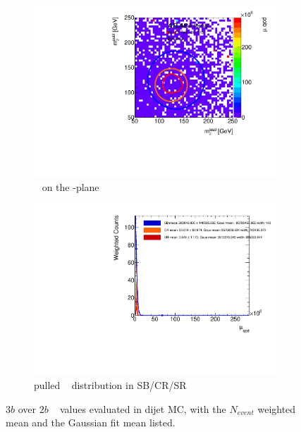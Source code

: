 \begin{figure}[htbp!]
\centering
\captionsetup{justification=centering}
	\hspace{-1cm}
    \begin{subfigure}[b]{0.4\textwidth}
        \includegraphics[width=\textwidth,angle=-90]{figures/boosted/AppendixMuqcdstudy/QCD_ThreeTag_Incl_mH0H1.pdf}
        \caption{\muqcd~ on the \mleadJ-\msublJ plane}
        \label{fig:app-muqcd-3b-2d-qcd}
    \end{subfigure}
    \quad \quad \quad \quad 
    \begin{subfigure}[b]{0.4\textwidth}
        \includegraphics[width=\textwidth,angle=-90]{figures/boosted/AppendixMuqcdstudy/QCD_ThreeTag_Incl_mH0H1_pull.pdf}
        \caption{pulled \muqcd~ distribution in SB/CR/SR}
        \label{fig:app-muqcd-3b-pull-qcd}
    \end{subfigure}
\caption{$3b$ over $2b$ \muqcd~ values evaluated in dijet MC, with the $N_{event}$ weighted mean and the Gaussian fit mean listed.}
\label{fig:app-muqcd-3b-qcd}
\end{figure}

